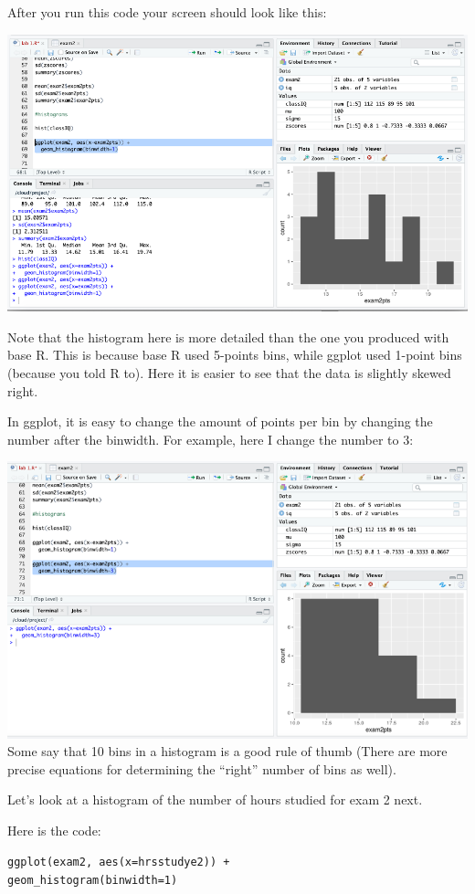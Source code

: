 \documentclass[
]{book}
\begin{document}
After you run this code your screen should look like this:

\includegraphics{img/tidyhist.png}

Note that the histogram here is more detailed than the one you produced with base R. This is because base R used 5-points bins, while ggplot used 1-point bins (because you told R to). Here it is easier to see that the data is slightly skewed right.

In ggplot, it is easy to change the amount of points per bin by changing the number after the binwidth. For example, here I change the number to 3:

\includegraphics{img/tidyhist2.png}
Some say that 10 bins in a histogram is a good rule of thumb (There are more precise equations for determining the ``right'' number of bins as well).

Let's look at a histogram of the number of hours studied for exam 2 next.

Here is the code:

\texttt{ggplot(exam2,\ aes(x=hrsstudye2))\ +}\\
\texttt{geom\_histogram(binwidth=1)}
\end{document}
